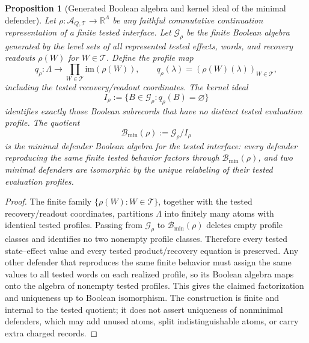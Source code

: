 \documentclass[11pt]{article}
\newtheorem{proposition}[theorem]{Proposition}
\newcommand{\R}{\mathbb R}
\newcommand{\AQtest}{\mathcal A_{Q,\mathcal T}}
\begin{document}
\begin{proposition}[Generated Boolean algebra and kernel ideal of the minimal defender]
\label{prop:generated-boolean-kernel-minimal-defender}
Let \(\rho:\AQtest\to\R^\Lambda\) be any faithful commutative continuation representation of a finite tested interface.  Let \(\mathcal G_\rho\) be the finite Boolean algebra generated by the level sets of all represented tested effects, words, and recovery readouts \(\rho(W)\) for \(W\in\mathcal T\).  Define the profile map
\[
  q_\rho:\Lambda\longrightarrow
  \prod_{W\in\mathcal T}\mathrm{im}(\rho(W)),
  \qquad
  q_\rho(\lambda)=(\rho(W)(\lambda))_{W\in\mathcal T},
\]
including the tested recovery/readout coordinates.  The kernel ideal
\[
  I_\rho:=\{B\in\mathcal G_\rho: q_\rho(B)=\varnothing\}
\]
identifies exactly those Boolean subrecords that have no distinct tested evaluation profile.  The quotient
\[
  \mathcal B_{\min}(\rho):=\mathcal G_\rho/I_\rho
\]
is the minimal defender Boolean algebra for the tested interface: every defender reproducing the same finite tested behavior factors through \(\mathcal B_{\min}(\rho)\), and two minimal defenders are isomorphic by the unique relabeling of their tested evaluation profiles.
\end{proposition}
\begin{proof}
The finite family \(\{\rho(W):W\in\mathcal T\}\), together with the tested recovery/readout coordinates, partitions \(\Lambda\) into finitely many atoms with identical tested profiles.  Passing from \(\mathcal G_\rho\) to \(\mathcal B_{\min}(\rho)\) deletes empty profile classes and identifies no two nonempty profile classes.  Therefore every tested state--effect value and every tested product/recovery equation is preserved.  Any other defender that reproduces the same finite behavior must assign the same values to all tested words on each realized profile, so its Boolean algebra maps onto the algebra of nonempty tested profiles.  This gives the claimed factorization and uniqueness up to Boolean isomorphism.  The construction is finite and internal to the tested quotient; it does not assert uniqueness of nonminimal defenders, which may add unused atoms, split indistinguishable atoms, or carry extra charged records.
\end{proof}
\end{document}
